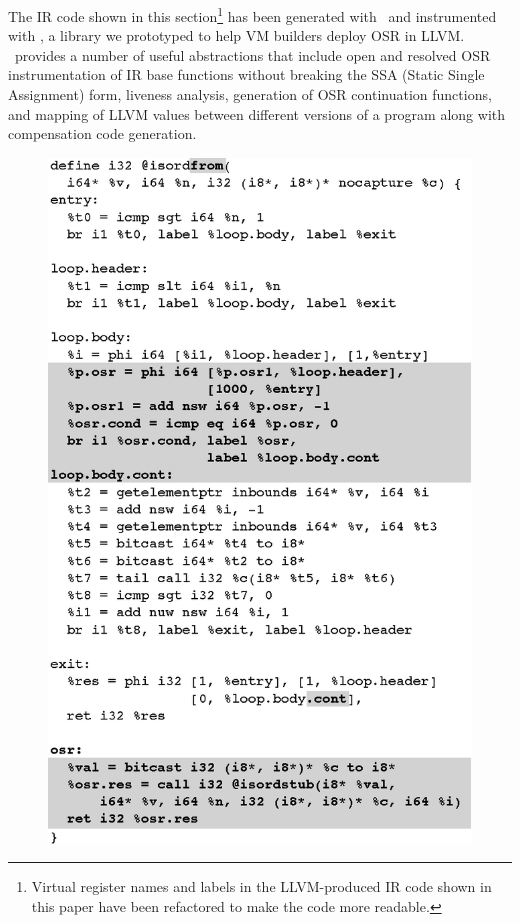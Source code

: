 The IR code shown in this section\footnote{Virtual register names and labels in the LLVM-produced IR code shown in this paper have been refactored to make the code more readable.} has been generated with \clang\ and instrumented with \osrkit, a library we prototyped to help VM builders deploy OSR in LLVM. \osrkit\ provides a number of useful abstractions that include open and resolved OSR instrumentation of IR base functions without breaking the SSA (Static Single Assignment) form, liveness analysis, generation of OSR continuation functions, and mapping of LLVM values between different versions of a program along with compensation code generation.


\ifdefined\noauthorea
\begin{figure}[t]
\begin{center}
\includegraphics[width=0.9\columnwidth]{figures/isordfrom/isordfrom.eps}
\caption{\protect}
\end{center}
\end{figure}
\fi

